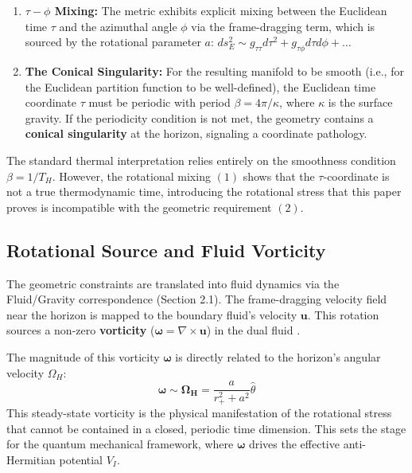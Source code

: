 \documentclass[11pt]{article}
\begin{document}
\begin{enumerate}
    \item \textbf{$\tau-\phi$ Mixing:} The metric exhibits explicit mixing between the Euclidean time $\tau$ and the azimuthal angle $\phi$ via the frame-dragging term, which is sourced by the rotational parameter $a$: $ds^2_E \sim g_{\tau\tau} d\tau^2 + g_{\tau\phi} d\tau d\phi + \dots$
    \item \textbf{The Conical Singularity:} For the resulting manifold to be smooth (i.e., for the Euclidean partition function to be well-defined), the Euclidean time coordinate $\tau$ must be periodic with period $\beta = 4\pi/\kappa$, where $\kappa$ is the surface gravity. If the periodicity condition is not met, the geometry contains a \textbf{conical singularity} at the horizon, signaling a coordinate pathology.
\end{enumerate}

The standard thermal interpretation relies entirely on the smoothness condition $\beta = 1/T_H$. However, the rotational mixing $(1)$ shows that the $\tau$-coordinate is not a true thermodynamic time, introducing the rotational stress that this paper proves is incompatible with the geometric requirement $(2)$.

\subsection{Rotational Source and Fluid Vorticity}

The geometric constraints are translated into fluid dynamics via the Fluid/Gravity correspondence (Section 2.1). The frame-dragging velocity field near the horizon is mapped to the boundary fluid's velocity $\mathbf{u}$. This rotation sources a non-zero \textbf{vorticity} ($\mathbf{\omega} = \nabla \times \mathbf{u}$) in the dual fluid \cite{appendix_a2_vorticity_calculation.tex}.

The magnitude of this vorticity $\mathbf{\omega}$ is directly related to the horizon's angular velocity $\Omega_H$:
\begin{equation}\label{eq:omega_scaling}
    \mathbf{\omega} \sim \mathbf{\Omega_H} = \frac{a}{r_+^2 + a^2} \hat{\theta}
\end{equation}
This steady-state vorticity is the physical manifestation of the rotational stress that cannot be contained in a closed, periodic time dimension. This sets the stage for the quantum mechanical framework, where $\mathbf{\omega}$ drives the effective anti-Hermitian potential $V_I$.
\end{document}
